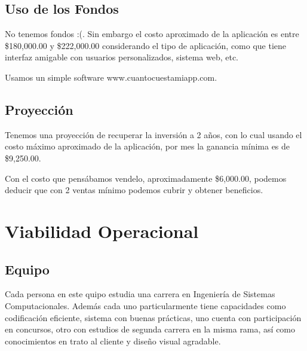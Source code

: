 \documentclass[12pt, fleqn]{report}                             %
\theoremstyle{break}                                            %
\begin{document}
    \subsection{Uso de los Fondos}
    No tenemos fondos :(.
    Sin embargo el costo aproximado de la aplicación es entre \$180,000.00 y \$222,000.00 considerando el tipo de aplicación, como que tiene interfaz amigable con usuarios personalizados, sistema web, etc.
    
    
    Usamos un simple software www.cuantocuestamiapp.com.
    
    \subsection{Proyección}
    Tenemos una proyección de recuperar la inversión a 2 años, con lo cual usando el costo máximo aproximado de la aplicación, por mes la ganancia mínima es de \$9,250.00.
    
    
    Con el costo que pensábamos vendelo, aproximadamente \$6,000.00, podemos deducir que con 2 ventas mínimo podemos cubrir y obtener beneficios.

    
    \clearpage
    
    
    
\section{Viabilidad Operacional}


    \subsection{Equipo}
    Cada persona en este quipo estudia una carrera en Ingeniería de Sistemas Computacionales. Además cada uno particularmente tiene capacidades como codificación eficiente, sistema con buenas prácticas, uno cuenta con participación en concursos, otro con estudios de segunda carrera en la misma rama, así como conocimientos en trato al cliente y diseño visual agradable.
    
\end{document}
